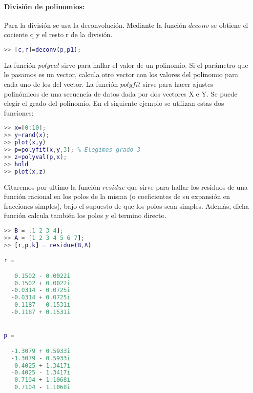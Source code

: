 \paragraph{División de polinomios:}
Para la división se usa la deconvolución. Mediante la función $deconv$ se obtiene el cociente q y el resto r de la división.
\begin{lstlisting}[language=Matlab]
>> [c,r]=deconv(p,p1);
\end{lstlisting}

La función $polyval$ sirve para hallar el valor de un polinomio. Si el parámetro que le pasamos es un vector, calcula otro vector con los valores del polinomio para cada uno de los del vector. La función $polyfit$ sirve para hacer ajustes polinómicos de una secuencia de datos dada por dos vectores X e Y. Se puede elegir el grado del polinomio. En el siguiente ejemplo se utilizan estas dos funciones:
\begin{lstlisting}[language=Matlab]
>> x=[0:10];
>> y=rand(x);
>> plot(x,y)
>> p=polyfit(x,y,3); % Elegimos grado 3
>> z=polyval(p,x);
>> hold
>> plot(x,z)
\end{lstlisting}

Citaremos por ultimo la función $residue$ que sirve para hallar los residuos de una función racional en los polos de la misma (o coeficientes de su expansión en fracciones simples), bajo el supuesto de que los polos sean simples. Además, dicha función calcula también los polos y el termino directo.
\begin{lstlisting}[language=Matlab]
>> B = [1 2 3 4];
>> A = [1 2 3 4 5 6 7];
>> [r,p,k] = residue(B,A)

r =

   0.1502 - 0.0022i
   0.1502 + 0.0022i
  -0.0314 - 0.0725i
  -0.0314 + 0.0725i
  -0.1187 - 0.1531i
  -0.1187 + 0.1531i


p =

  -1.3079 + 0.5933i
  -1.3079 - 0.5933i
  -0.4025 + 1.3417i
  -0.4025 - 1.3417i
   0.7104 + 1.1068i
   0.7104 - 1.1068i

\end{lstlisting}